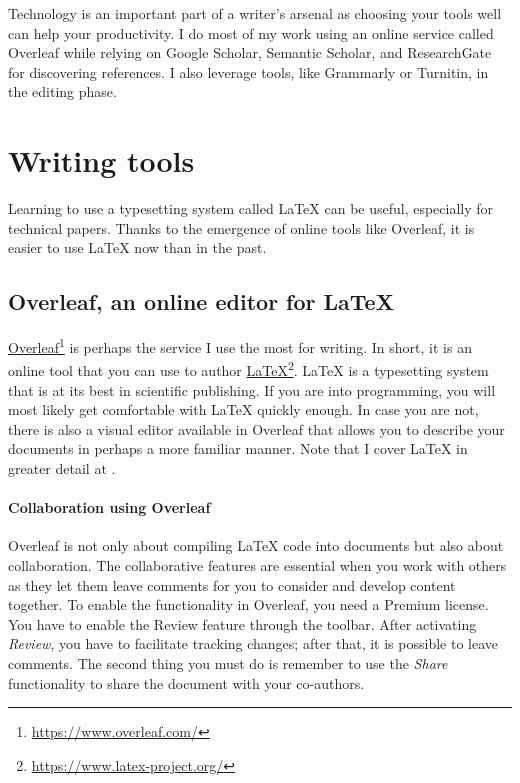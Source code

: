 Technology is an important part of a writer's arsenal as choosing your tools well can help your productivity.
I do most of my work using an online service called Overleaf while relying on Google Scholar, Semantic Scholar, and ResearchGate for discovering references.
I also leverage tools, like Grammarly or Turnitin, in the editing phase.

\section{Writing tools}

Learning to use a typesetting system called LaTeX can be useful, especially for technical papers.
Thanks to the emergence of online tools like Overleaf, it is easier to use LaTeX now than in the past.

\subsection{Overleaf, an online editor for LaTeX}

\href{https://www.overleaf.com/}{Overleaf}\footnote{\url{https://www.overleaf.com/}} is perhaps the service I use the most for writing. In short, it is an online tool that you can use to author \href{https://www.latex-project.org/}{LaTeX}\footnote{\url{https://www.latex-project.org/}}.
LaTeX is a typesetting system that is at its best in scientific publishing.
If you are into programming, you will most likely get comfortable with LaTeX quickly enough.
In case you are not, there is also a visual editor available in Overleaf that allows you to describe your documents in perhaps a more familiar manner.
Note that I cover LaTeX in greater detail at .

\paragraph{Collaboration using Overleaf}

Overleaf is not only about compiling LaTeX code into documents but also about collaboration.
The collaborative features are essential when you work with others as they let them leave comments for you to consider and develop content together.
To enable the functionality in Overleaf, you need a Premium license.
You have to enable the Review feature through the toolbar.
After activating \textit{Review}, you have to facilitate tracking changes; after that, it is possible to leave comments.
The second thing you must do is remember to use the \textit{Share} functionality to share the document with your co-authors.

